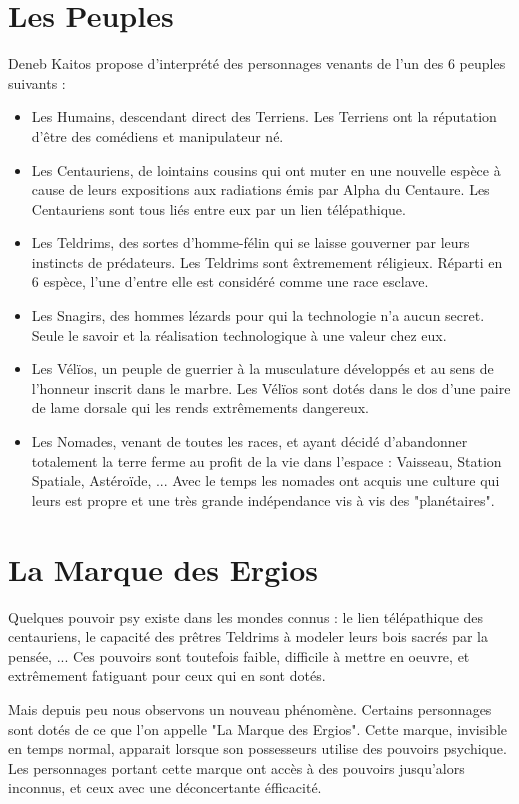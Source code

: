 \documentclass{DenebClass}
\begin{document}
\begin{multicols}{2}
\section{Les Peuples}

Deneb Kaitos propose d'interprété des personnages venants de l'un des 6 peuples suivants :

\begin{itemize}
\item Les Humains, descendant direct des Terriens. Les Terriens ont la réputation d'être des comédiens et manipulateur né. 
\item Les Centauriens, de lointains cousins qui ont muter en une nouvelle espèce à cause de leurs expositions aux radiations émis par Alpha du Centaure. Les Centauriens sont tous liés entre eux par un lien télépathique.
\item Les Teldrims, des sortes d'homme-félin qui se laisse gouverner par leurs instincts de prédateurs. Les Teldrims sont êxtremement réligieux. Réparti en 6 espèce, l'une d'entre elle est considéré comme une race esclave.
\item Les Snagirs, des hommes lézards pour qui la technologie n'a aucun secret. Seule le savoir et la réalisation technologique à une valeur chez eux.
\item Les Vélïos, un peuple de guerrier à la musculature développés et au sens de l'honneur inscrit dans le marbre. Les Vélïos sont dotés dans le dos d'une paire de lame dorsale qui les rends extrêmements dangereux. 
\item Les Nomades, venant de toutes les races, et ayant décidé d'abandonner totalement la terre ferme au profit de la vie dans l'espace : Vaisseau, Station Spatiale, Astéroïde, ... Avec le temps les nomades ont acquis une culture qui leurs est propre et une très grande indépendance vis à vis des "planétaires".
\end{itemize}

\section{La Marque des Ergios}

Quelques pouvoir psy existe dans les mondes connus : le lien télépathique des centauriens, le capacité des prêtres Teldrims à modeler leurs bois sacrés par la pensée, ... Ces pouvoirs sont toutefois faible, difficile à mettre en oeuvre, et extrêmement fatiguant pour ceux qui en sont dotés.

Mais depuis peu nous observons un nouveau phénomène. Certains personnages sont dotés de ce que l'on appelle "La Marque des Ergios". Cette marque, invisible en temps normal, apparait lorsque son possesseurs utilise des pouvoirs psychique. Les personnages portant cette marque ont accès à des pouvoirs jusqu'alors inconnus, et ceux avec une déconcertante éfficacité.


\end{multicols}
\end{document}
